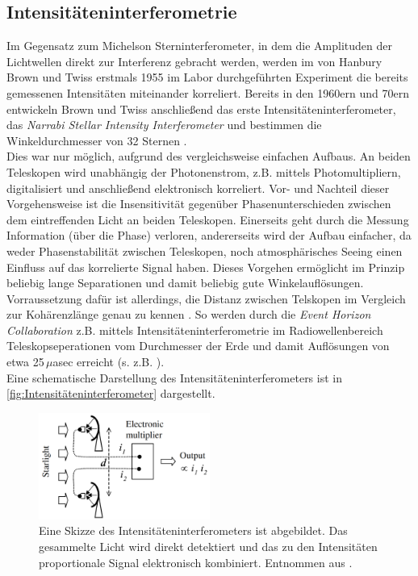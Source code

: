 \subsection{Intensitäteninterferometrie}
\label{ssec:Intensitäteninterferometrie}
Im Gegensatz zum Michelson Sterninterferometer, in dem die Amplituden der Lichtwellen direkt zur Interferenz gebracht werden, werden im von Hanbury Brown und Twiss erstmals 1955 im Labor durchgeführten Experiment \cite{brownCorrelationPhotonsTwo1956} die bereits gemessenen Intensitäten miteinander korreliert. 
Bereits in den 1960ern und 70ern entwickeln Brown und Twiss anschließend das erste Intensitäteninterferometer, das \emph{Narrabi Stellar Intensity Interferometer} und bestimmen die Winkeldurchmesser von 32 Sternen \cite[Kap. 1]{brownIntensityInterferometerIts1974}. \\
Dies war nur möglich, aufgrund des vergleichsweise einfachen Aufbaus. 
An beiden Teleskopen wird unabhängig der Photonenstrom, z.B. mittels Photomultipliern, digitalisiert und anschließend elektronisch korreliert. 
Vor- und Nachteil dieser Vorgehensweise ist die Insensitivität gegenüber Phasenunterschieden zwischen dem eintreffenden Licht an beiden Teleskopen. 
Einerseits geht durch die Messung Information (über die Phase) verloren, andererseits wird der Aufbau einfacher, da weder Phasenstabilität zwischen Teleskopen, noch atmosphärisches Seeing einen Einfluss auf das korrelierte Signal haben.
Dieses Vorgehen ermöglicht im Prinzip beliebig lange Separationen und damit beliebig gute Winkelauflösungen. 
Vorraussetzung dafür ist allerdings, die Distanz zwischen Telskopen im Vergleich zur Kohärenzlänge genau zu kennen \cite{foellmiIntensityInterferometrySecondorder2009}. 
So werden durch die \emph{Event Horizon Collaboration} z.B. mittels Intensitäteninterferometrie im Radiowellenbereich Teleskopseperationen vom Durchmesser der Erde und damit Auflösungen von etwa 25\,$\mu$asec erreicht (s. z.B. \cite{collaborationFirstSagittariusEvent2022}). \\

Eine schematische Darstellung des Intensitäteninterferometers ist in \autoref{fig:Intensitäteninterferometer} dargestellt. 
\begin{figure}[htbp]
    \centering
    \includegraphics[width=0.5\textwidth]{images/Theorie/Fox_6.1b.png}
    \caption{Eine Skizze des Intensitäteninterferometers ist abgebildet. Das gesammelte Licht wird direkt detektiert und das zu den Intensitäten proportionale Signal elektronisch kombiniert. Entnommen aus \cite[Fig. 6.1(b)]{foxQuantumOpticsIntroduction2006}.}
    \label{fig:Intensitäteninterferometer}
\end{figure}

